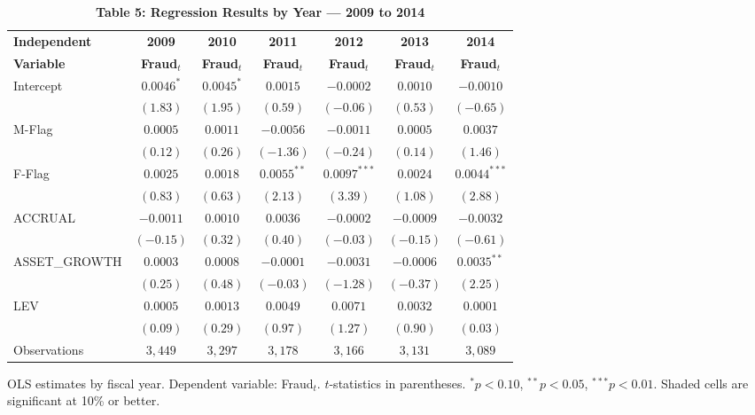 \documentclass[12pt]{article}
\newcommand{\sig}[1]{\cellcolor{siggreen}#1}
\begin{document}
\begin{table}[h!]
\centering
\caption*{\textbf{Table 5: Regression Results by Year — 2009 to 2014}}
\begin{threeparttable}
\setlength{\tabcolsep}{5pt}
\begin{tabular}{lcccccc}
\toprule
\textbf{Independent} & \textbf{2009} & \textbf{2010} & \textbf{2011} &
  \textbf{2012} & \textbf{2013} & \textbf{2014} \\
\textbf{Variable}    & \textbf{Fraud}$_t$ & \textbf{Fraud}$_t$ & \textbf{Fraud}$_t$ &
  \textbf{Fraud}$_t$ & \textbf{Fraud}$_t$ & \textbf{Fraud}$_t$ \\
\midrule
Intercept
  & $0.0046^{*}$  & $0.0045^{*}$  & $0.0015$      & $-0.0002$     & $0.0010$      & $-0.0010$ \\
  & $(1.83)$      & $(1.95)$      & $(0.59)$       & $(-0.06)$     & $(0.53)$      & $(-0.65)$ \\[4pt]
M-Flag
  & $0.0005$    & $0.0011$    & $-0.0056$   & $-0.0011$   & $0.0005$    & $0.0037$ \\
  & $(0.12)$    & $(0.26)$    & $(-1.36)$   & $(-0.24)$   & $(0.14)$    & $(1.46)$ \\[4pt]
F-Flag
  & $0.0025$    & $0.0018$    & \sig{$0.0055^{**}$}  & \sig{$0.0097^{***}$} & $0.0024$   & \sig{$0.0044^{***}$} \\
  & $(0.83)$    & $(0.63)$    & \sig{$(2.13)$}        & \sig{$(3.39)$}        & $(1.08)$   & \sig{$(2.88)$}        \\[4pt]
ACCRUAL
  & $-0.0011$   & $0.0010$    & $0.0036$    & $-0.0002$   & $-0.0009$   & $-0.0032$ \\
  & $(-0.15)$   & $(0.32)$    & $(0.40)$    & $(-0.03)$   & $(-0.15)$   & $(-0.61)$ \\[4pt]
ASSET\_GROWTH
  & $0.0003$    & $0.0008$    & $-0.0001$   & $-0.0031$   & $-0.0006$   & \sig{$0.0035^{**}$} \\
  & $(0.25)$    & $(0.48)$    & $(-0.03)$   & $(-1.28)$   & $(-0.37)$   & \sig{$(2.25)$}       \\[4pt]
LEV
  & $0.0005$    & $0.0013$    & $0.0049$    & $0.0071$    & $0.0032$    & $0.0001$ \\
  & $(0.09)$    & $(0.29)$    & $(0.97)$    & $(1.27)$    & $(0.90)$    & $(0.03)$ \\[6pt]
Observations
  & $3{,}449$   & $3{,}297$   & $3{,}178$   & $3{,}166$   & $3{,}131$   & $3{,}089$ \\
\bottomrule
\end{tabular}
\begin{tablenotes}
\small\item
OLS estimates by fiscal year. Dependent variable: Fraud$_t$.
$t$-statistics in parentheses. $^{*}p<0.10$, $^{**}p<0.05$, $^{***}p<0.01$.
Shaded cells are significant at 10\% or better.
\end{tablenotes}
\end{threeparttable}
\end{table}
\end{document}
